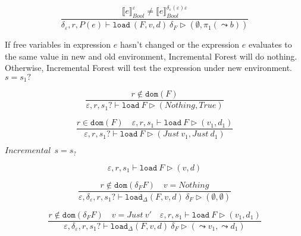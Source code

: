 \documentclass[10pt,twoside,a4paper]{article}
\theoremstyle{theorem}
\theoremstyle{lemma}
\theoremstyle{property}
\theoremstyle{definition}
\theoremstyle{assumption}
\def\fst{\pi_1}
\begin{document}
\begin{displaymath}
	\frac{ \llbracket e \rrbracket^{\varepsilon}_{Bool} \not= \llbracket e \rrbracket^{\delta_\varepsilon(\varepsilon) \varepsilon}_{Bool}}
	{\delta_\varepsilon, r, P(e) \vdash \mathtt{load}~ (F,v,d) ~\delta_F \rhd (\emptyset,\fst(\leadsto b))}
\end{displaymath}

If free variables in expression $e$ hasn't changed or the expression $e$ evaluates to the same value in new and old environment, Incremental Forest will do nothing.
Otherwise, Incremental Forest will test the expression under new environment.\\

$\boxed{s = s_1?}$

\begin{displaymath}
	\frac
	{r \notin \mathtt{dom}(F)}
	{\varepsilon, r, s_1? \vdash \mathtt{load}~F \rhd (Nothing, True)}
\end{displaymath}

\begin{displaymath}
	\frac
	{r \in \mathtt{dom}(F) \quad \varepsilon, r, s_1 \vdash \mathtt{load}~F \rhd (v_1, d_1)}
	{\varepsilon, r, s_1? \vdash \mathtt{load}~F \rhd (Just ~v_1, Just ~d_1)}
\end{displaymath}


$\boxed{Incremental~~s = s_?}$

\begin{displaymath}
	\varepsilon, r, s_1 \vdash \mathtt{load}~F \rhd (v, d)
\end{displaymath}

\begin{displaymath}
	\frac{
		r \notin \mathtt{dom}(\delta_F F) \quad v = Nothing
	}
	{\varepsilon, \delta_\varepsilon, r, s_1? \vdash \mathtt{load}_\Delta (F,v,d)~ \delta_F \rhd (\emptyset, \emptyset)}
\end{displaymath}
\begin{comment}
\begin{displaymath}
	\frac{
		r' = \varepsilon_{new}(r) \quad r \notin \mathtt{dom}(F) \quad r' \notin \mathtt{dom}(\delta_F~F)
	}
	{\delta_\varepsilon, s? \vdash \mathtt{load}_\Delta (F,v,d)~ u \rhd (\emptyset, \emptyset)}
\end{displaymath}
\end{comment}

\begin{displaymath}
	\frac{
		r \notin \mathtt{dom}(\delta_F F) \quad v = Just~ v' \quad
		\varepsilon, r, s_1 \vdash \mathtt{load}~F \rhd (v_1, d_1)
	}
	{\varepsilon, \delta_\varepsilon, r, s_1? \vdash \mathtt{load}_\Delta (F,v,d)~ \delta_F \rhd (\leadsto v_1, \leadsto d_1)}
\end{displaymath}
\end{document}
